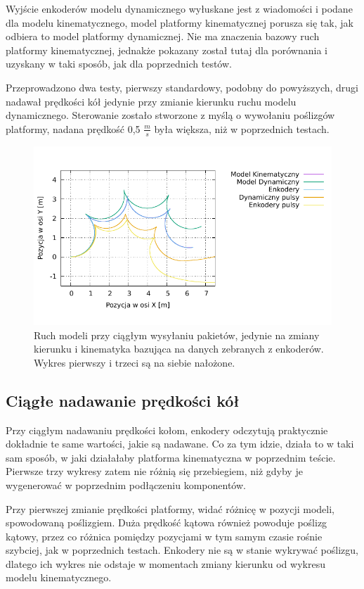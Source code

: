 	Wyjście enkoderów modelu dynamicznego wyłuskane jest z wiadomości i podane dla modelu kinematycznego, model platformy kinematycznej porusza się tak, jak odbiera to model platformy dynamicznej. Nie ma znaczenia bazowy ruch platformy kinematycznej, jednakże pokazany został tutaj dla porównania i uzyskany w taki sposób, jak dla poprzednich testów. 
	
	Przeprowadzono dwa testy, pierwszy standardowy, podobny do powyższych, drugi nadawał prędkości kół jedynie przy zmianie kierunku ruchu modelu dynamicznego.
	Sterowanie zostało stworzone z myślą o wywołaniu poślizgów platformy, nadana prędkość 0,5 $\frac{m}{s}$ była większa, niż w poprzednich testach.
	
	\begin{figure}[H]
		\centering
		\includegraphics[width=\textwidth]{plots/star_encoders.pdf}
			\caption{Ruch modeli przy ciągłym wysyłaniu pakietów, jedynie na zmiany kierunku i kinematyka bazująca na danych zebranych z enkoderów. Wykres pierwszy i trzeci są na siebie nałożone.}
		\label{plot:star_encoders}
	\end{figure}
	
	\subsection{Ciągłe nadawanie prędkości kół}
		Przy ciągłym nadawaniu prędkości kołom, enkodery odczytują praktycznie dokładnie te same wartości, jakie są nadawane.
		Co za tym idzie, działa to w taki sam sposób, w jaki działałaby platforma kinematyczna w poprzednim teście.
		Pierwsze trzy wykresy zatem nie różnią się przebiegiem, niż gdyby je wygenerować w poprzednim podłączeniu komponentów.
		
		Przy pierwszej zmianie prędkości platformy, widać różnicę w pozycji modeli, spowodowaną poślizgiem.
		Duża prędkość kątowa również powoduje poślizg kątowy, przez co różnica pomiędzy pozycjami w tym samym czasie rośnie szybciej, jak w poprzednich testach.
		Enkodery nie są w stanie wykrywać poślizgu, dlatego ich wykres nie odstaje w momentach zmiany kierunku od wykresu modelu kinematycznego.
		
